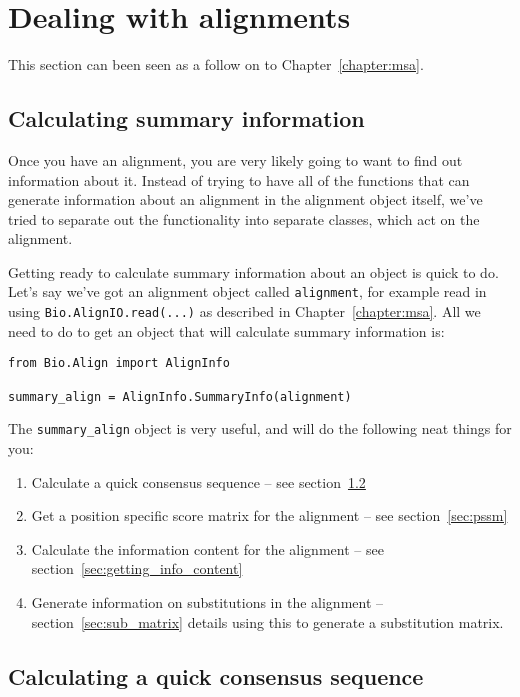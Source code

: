 \section{Dealing with alignments}

This section can been seen as a follow on to Chapter~\ref{chapter:msa}.

\subsection{Calculating summary information}
\label{sec:summary_info}

Once you have an alignment, you are very likely going to want to find out information about it. Instead of trying to have all of the functions that can generate information about an alignment in the alignment object itself, we've tried to separate out the functionality into separate classes, which act on the alignment.

Getting ready to calculate summary information about an object is quick to do. Let's say we've got an alignment object called \verb|alignment|, for example read in using \verb|Bio.AlignIO.read(...)| as described in Chapter~\ref{chapter:msa}. All we need to do to get an object that will calculate summary information is:

\begin{verbatim}
from Bio.Align import AlignInfo

summary_align = AlignInfo.SummaryInfo(alignment)
\end{verbatim}

The \verb|summary_align| object is very useful, and will do the following neat things for you:

\begin{enumerate}
  \item Calculate a quick consensus sequence -- see section~\ref{sec:consensus}
  \item Get a position specific score matrix for the alignment -- see section~\ref{sec:pssm}
  \item Calculate the information content for the alignment -- see section~\ref{sec:getting_info_content}
  \item Generate information on substitutions in the alignment -- section~\ref{sec:sub_matrix} details using this to generate a substitution matrix.
\end{enumerate}

\subsection{Calculating a quick consensus sequence}
\label{sec:consensus}

